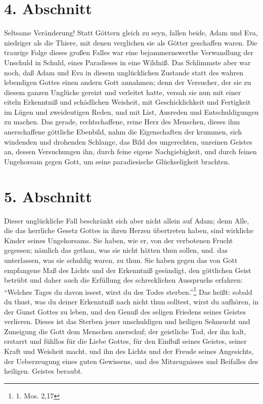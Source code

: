 \section{4. Abschnitt}

Seltsame Veränderung! Statt Göttern gleich zu seyn, fallen beide, Adam und Eva,
niedriger als die Thiere, mit denen verglichen sie als Götter geschaffen waren.
Die traurige Folge dieses großen Falles war eine bejammernswerthe Verwandlung
der Unschuld in Schuld, eines Paradieses in eine Wildniß. Das Schlimmste aber
war noch, daß Adam und Eva in diesem unglücklichen Zustande statt des wahren
lebendigen Gottes einen andern Gott annahmen; denn der Versucher, der sie zu
diesem ganzen Unglücke gereizt und verleitet hatte, versah sie nun mit einer
eiteln Erkenntniß und schädlichen Weisheit, mit Geschicklichkeit und Fertigkeit
im Lügen und zweideutigen Reden, und mit List, Ausreden und Entschuldigungen zu
machen. Das gerade, rechtschaffene, reine Herz des Menschen, dieses ihm
anerschaffene göttliche Ebenbild, nahm die Eigenschaften der krummen, sich
windenden und drohenden Schlange, das Bild des ungerechten, unreinen Geistes an,
dessen Versuchungen ihn, durch feine eigene Nachgiebigkeit, und durch feinen
Ungehorsam gegen Gott, um seine paradiesische Glückseligkeit brachten.

\section{5. Abschnitt}

Dieser unglückliche Fall beschränkt sich aber nicht allein auf Adam; denn Alle,
die das herrliche Gesetz Gottes in ihren Herzen übertreten haben, sind wirkliche
Kinder seines Ungehorsams. Sie haben, wie er, von der verbotenen Frucht
gegessen; nämlich das gethan, was sie nicht hätten thun sollen, und. das
unterlassen, was sie schuldig waren, zu thun. Sie haben gegen das von Gott
empfangene Maß des Lichts und der Erkenntniß gesündigt, den göttlichen Geist
betrübt und daher auch die Erfüllung des schrecklichen Ausspruchs erfahren:
"`Welches Tages du davon issest, wirst du des Todes sterben."'\footnote{1. Mos.
2,17} Das heißt: sobald du thust, was du deiner Erkenntniß nach nicht thun
solltest, wirst du aufhören, in der Gunst Gottes zu leben, und den Genuß des
seligen Friedens seines Geistes verlieren. Dieses ist das Sterben jener
unschuldigen und heiligen Sehnsucht und Zuneigung die Gott dem Menschen
anerschuf; der geistliche Tod, der ihn kalt, erstarrt und fühllos für die Liebe
Gottes, für den Einfluß seines Geistes, seiner Kraft und Weisheit macht, und ihn
des Lichts und der Freude seines Angesichts, der Ueberzeugung eines guten
Gewissens, und des Mitzeugnisses und Beifalles des heiligen. Geistes beraubt.

